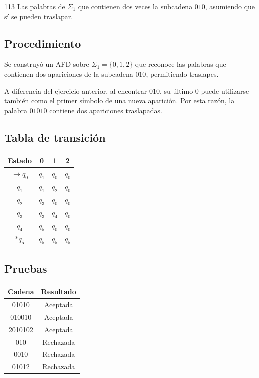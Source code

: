 \documentclass[12pt]{article}
\newcounter{ejercicio}
\begin{document}
\begin{enunciado}{113}
Las palabras de $\Sigma_1$ que contienen dos veces la subcadena $010$,
asumiendo que sí se pueden traslapar.
\end{enunciado}
\subsection*{Procedimiento}

Se construyó un AFD sobre $\Sigma_1=\{0,1,2\}$ que reconoce las palabras
que contienen dos apariciones de la subcadena $010$, permitiendo
traslapes.

A diferencia del ejercicio anterior, al encontrar $010$, su último $0$
puede utilizarse también como el primer símbolo de una nueva aparición.
Por esta razón, la palabra $01010$ contiene dos apariciones traslapadas.

\subsection*{Tabla de transición}

\begin{center}
\begin{tabular}{c|ccc}
Estado & 0 & 1 & 2 \\ \hline
$\rightarrow q_0$ & $q_1$ & $q_0$ & $q_0$ \\
$q_1$ & $q_1$ & $q_2$ & $q_0$ \\
$q_2$ & $q_3$ & $q_0$ & $q_0$ \\
$q_3$ & $q_3$ & $q_4$ & $q_0$ \\
$q_4$ & $q_5$ & $q_0$ & $q_0$ \\
$*q_5$ & $q_5$ & $q_5$ & $q_5$
\end{tabular}
\end{center}

\subsection*{Pruebas}

\begin{center}
\begin{tabular}{c|c}
Cadena & Resultado \\ \hline
01010 & Aceptada \\
010010 & Aceptada \\
2010102 & Aceptada \\
010 & Rechazada \\
0010 & Rechazada \\
01012 & Rechazada
\end{tabular}
\end{center}
\end{document}
